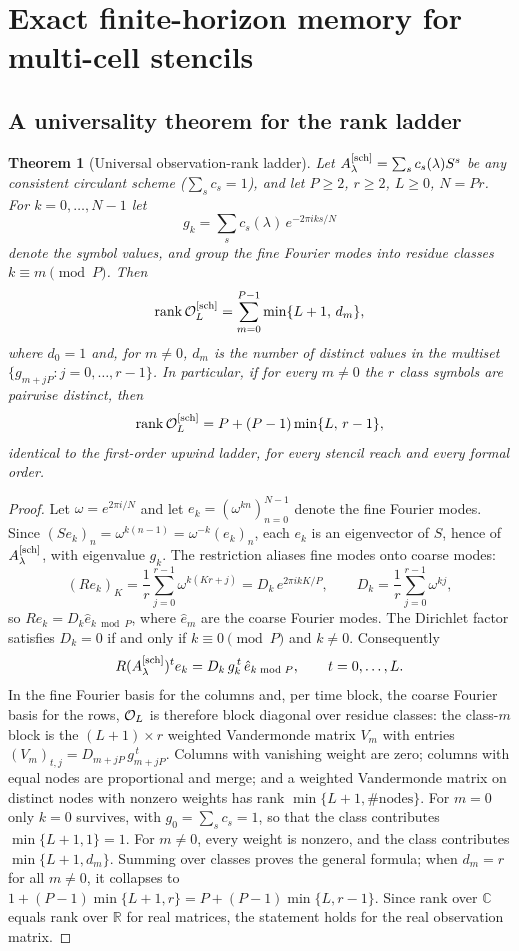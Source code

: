 \documentclass[pdflatex,sn-mathphys-num]{sn-jnl}%
\theoremstyle{thmstyleone}%
\newtheorem{theorem}{Theorem}%
\theoremstyle{thmstyletwo}%
\theoremstyle{thmstylethree}%
\newcommand{\R}{\mathbb R}
\DeclareMathOperator{\rank}{rank}
\newcommand{\OL}{{\cal O}_L}
\newcommand{\Asch}{A^{[\rm sch]}_\lambda}
\begin{document}
\section{Exact finite-horizon memory for multi-cell stencils}\label{sec:rank}

\subsection{A universality theorem for the rank ladder}\label{sec:rank-law}

\begin{theorem}[Universal observation-rank ladder]\label{thm:rank-universal}
Let $\Asch=\sum_s c_s(\lambda)S^{s}$ be any consistent circulant scheme ($\sum_s c_s=1$), and let $P\ge2$, $r\ge2$, $L\ge0$, $N=Pr$.
For $k=0,\ldots,N-1$ let \[ g_k=\sum_s c_s(\lambda)\,e^{-2\pi iks/N} \] denote the symbol values, and group the fine Fourier modes into residue classes $k\equiv m\pmod P$.
Then \[ \rank\OL^{[\rm sch]} = \sum_{m=0}^{P-1}\min\{L+1,\,d_m\}, \] where $d_0=1$ and, for $m\ne0$, $d_m$ is the number of distinct values in the multiset $\{g_{m+jP}:j=0,\ldots,r-1\}$.
In particular, if for every $m\ne0$ the $r$ class symbols are pairwise distinct, then \[ \rank\OL^{[\rm sch]} = P+(P-1)\min\{L,\,r-1\}, \] identical to the first-order upwind ladder, for every stencil reach and every formal order.
\end{theorem}

\begin{proof}
Let $\omega=e^{2\pi i/N}$ and let $e_k=(\omega^{kn})_{n=0}^{N-1}$ denote the fine Fourier modes.
Since $(Se_k)_n=\omega^{k(n-1)}=\omega^{-k}(e_k)_n$, each $e_k$ is an eigenvector of $S$, hence of $\Asch$, with eigenvalue $g_k$.
The restriction aliases fine modes onto coarse modes: \[ (Re_k)_K = \frac1r\sum_{j=0}^{r-1}\omega^{k(Kr+j)} = D_k\,e^{2\pi ikK/P}, \qquad D_k=\frac1r\sum_{j=0}^{r-1}\omega^{kj}, \] so $Re_k=D_k\hat e_{k\bmod P}$, where $\hat e_m$ are the coarse Fourier modes.
The Dirichlet factor satisfies $D_k=0$ if and only if $k\equiv0\pmod P$ and $k\ne0$.
Consequently \[ R(\Asch)^{t}e_k=D_k\,g_k^{\,t}\,\hat e_{k\bmod P}, \qquad t=0,\ldots,L .\]
In the fine Fourier basis for the columns and, per time block, the coarse Fourier basis for the rows, $\OL$ is therefore block diagonal over residue classes: the class-$m$ block is the $(L+1)\times r$ weighted Vandermonde matrix $V_m$ with entries $(V_m)_{t,j}=D_{m+jP}\,g_{m+jP}^{\,t}$.
Columns with vanishing weight are zero; columns with equal nodes are proportional and merge; and a weighted Vandermonde matrix on distinct nodes with nonzero weights has rank $\min\{L+1,\#\mathrm{nodes}\}$.
For $m=0$ only $k=0$ survives, with $g_0=\sum_sc_s=1$, so that the class contributes $\min\{L+1,1\}=1$.
For $m\ne0$, every weight is nonzero, and the class contributes $\min\{L+1,d_m\}$.
Summing over classes proves the general formula; when $d_m=r$ for all $m\ne0$, it collapses to $1+(P-1)\min\{L+1,r\}=P+(P-1)\min\{L,r-1\}$.
Since rank over $\mathbb C$ equals rank over $\R$ for real matrices, the statement holds for the real observation matrix.
\end{proof}
\end{document}
